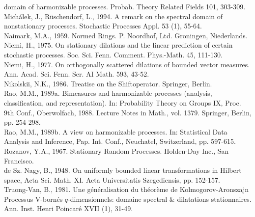 \documentclass{article}
\begin{document}
domain of harmonizable processes. Probab. Theory Related Fields 101,
303-309.\\
Mich{\'a}lek, J., R{\"u}schendorf, L., 1994. A remark on the spectral domain
of nonstationary processes. Stochastic Processes Appl. 53 (1), 55-64.\\
Naimark, M.A., 1959. Normed Rings. P. Noordhof, Ltd. Groningen, Niederlands.\\
Niemi, H., 1975. On stationary dilations and the linear prediction of certain
stochastic processes. Soc. Sci. Fenn. Comment. Phys.-Math. 45, 111-130.\\
Niemi, H., 1977. On orthogonally scattered dilations of bounded vector
measures. Ann. Acad. Sci. Fenn. Ser. AI Math. 593, 43-52.\\
Nikolskii, N.K., 1986. Treatise on the Shiftoperator. Springer, Berlin.\\
Rao, M.M., 1989a. Bimeasures and harmonizable processes (analysis,
classification, and representation). In: Probability Theory on Groups IX,
Proc. 9th Conf., Oberwolfach, 1988. Lecture Notes in Math., vol. 1379.
Springer, Berlin, pp. 254-298.\\
Rao, M.M., 1989b. A view on harmonizable processes. In: Statistical Data
Analysis and Inference, Pap. Int. Conf., Neuchatel, Switzerland, pp.
597-615.\\
Rozanov, Y.A., 1967. Stationary Random Processes. Holden-Day Inc., San
Francisco.\\
de Sz. Nagy, B., 1948. On uniformly bounded linear transformations in Hilbert
space, Acta Sci. Math. XI. Acta Universitatis Szegediensis, pp. 152-157.\\
Truong-Van, B., 1981. Une g{\'e}n{\'e}ralisation du th{\'e}or{\`e}me de
Kolmogorov-Aronszajn Processus V-born{\'e}s $q$-dimensionnels: domaine
spectral \& dilatations stationnaires. Ann. Inst. Henri Poincar{\'e} XVII (1),
31-49.
\end{document}
